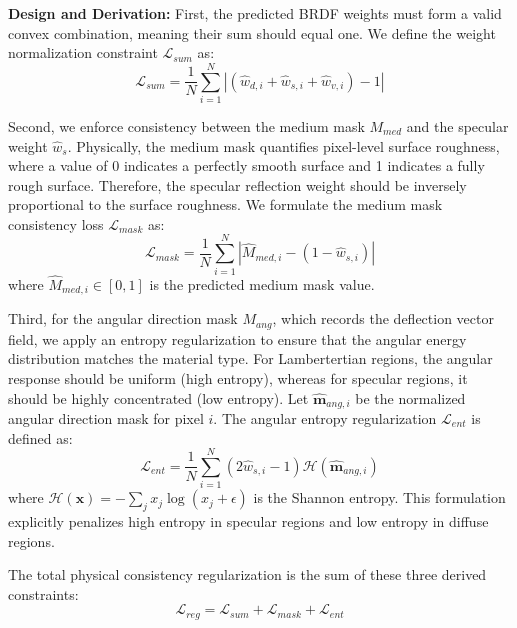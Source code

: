 \textbf{Design and Derivation:}
First, the predicted BRDF weights must form a valid convex combination, meaning their sum should equal one. We define the weight normalization constraint $\mathcal{L}_{sum}$ as:
\begin{equation}
\label{eq:eq47}
\mathcal{L}_{sum} = \frac{1}{N} \sum_{i=1}^{N} \left| \left( \hat{w}_{d,i} + \hat{w}_{s,i} + \hat{w}_{v,i} \right) - 1 \right|
\end{equation}

Second, we enforce consistency between the medium mask $M_{med}$ and the specular weight $\hat{w}_s$. Physically, the medium mask quantifies pixel-level surface roughness, where a value of 0 indicates a perfectly smooth surface and 1 indicates a fully rough surface. Therefore, the specular reflection weight should be inversely proportional to the surface roughness. We formulate the medium mask consistency loss $\mathcal{L}_{mask}$ as:
\begin{equation}
\label{eq:eq48}
\mathcal{L}_{mask} = \frac{1}{N} \sum_{i=1}^{N} \left| \hat{M}_{med, i} - (1 - \hat{w}_{s,i}) \right|
\end{equation}
where $\hat{M}_{med, i} \in [0, 1]$ is the predicted medium mask value.

Third, for the angular direction mask $M_{ang}$, which records the deflection vector field, we apply an entropy regularization to ensure that the angular energy distribution matches the material type. For Lambertertian regions, the angular response should be uniform (high entropy), whereas for specular regions, it should be highly concentrated (low entropy). Let $\hat{\mathbf{m}}_{ang, i}$ be the normalized angular direction mask for pixel $i$. The angular entropy regularization $\mathcal{L}_{ent}$ is defined as:
\begin{equation}
\label{eq:eq49}
\mathcal{L}_{ent} = \frac{1}{N} \sum_{i=1}^{N} (2\hat{w}_{s,i} - 1) \mathcal{H}(\hat{\mathbf{m}}_{ang, i})
\end{equation}
where $\mathcal{H}(\mathbf{x}) = -\sum_j x_j \log(x_j + \epsilon)$ is the Shannon entropy. This formulation explicitly penalizes high entropy in specular regions and low entropy in diffuse regions.

The total physical consistency regularization is the sum of these three derived constraints:
\begin{equation}
\label{eq:eq50}
\mathcal{L}_{reg} = \mathcal{L}_{sum} + \mathcal{L}_{mask} + \mathcal{L}_{ent}
\end{equation}

